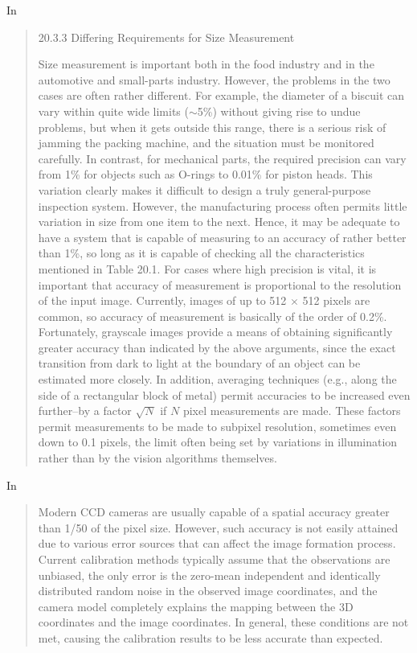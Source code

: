 \documentclass[a4paper,12pt]{article}
\begin{document}
In \cite{Davies:2012:CMV:2341317}
\begin{quotation}
20.3.3 Differing Requirements for Size Measurement

Size measurement is important both in the food industry and in the automotive
and small-parts industry. However, the problems in the two cases are often rather
different. For example, the diameter of a biscuit can vary within quite wide limits
($\sim$5\%) without giving rise to undue problems, but when it gets outside this range,
there is a serious risk of jamming the packing machine, and the situation must be
monitored carefully. In contrast, for mechanical parts, the required precision can
vary from 1\% for objects such as O-rings to 0.01\% for piston heads. This variation
clearly makes it difficult to design a truly general-purpose inspection system.
However, the manufacturing process often permits little variation in size from one
item to the next. Hence, it may be adequate to have a system that is capable of
measuring to an accuracy of rather better than 1\%, so long as it is capable of
checking all the characteristics mentioned in Table 20.1.
For cases where high precision is vital, it is important that accuracy of measurement
is proportional to the resolution of the input image. Currently, images of
up to 512 $\times$ 512 pixels are common, so accuracy of measurement is basically of
the order of 0.2\%. Fortunately, grayscale images provide a means of obtaining
significantly greater accuracy than indicated by the above arguments, since the
exact transition from dark to light at the boundary of an object can be estimated
more closely. In addition, averaging techniques (e.g., along the side of a rectangular
block of metal) permit accuracies to be increased even further--by a factor $\sqrt{N}$
if
$N$ pixel measurements are made. These factors permit measurements to be made to
subpixel resolution, sometimes even down to 0.1 pixels, the limit often being set by
variations in illumination rather than by the vision algorithms themselves.
\end{quotation}

In \cite{oulu}
\begin{quotation}
Modern CCD cameras are usually capable of a spatial accuracy greater than 1/50 of the pixel size. However, such accuracy is not easily attained due to various error sources that can affect the image formation process. Current calibration methods typically assume that the observations are unbiased, the only error is the zero-mean independent and identically distributed random noise in the observed image coordinates, and the camera model completely explains the mapping between the 3D coordinates and the image coordinates. In general, these conditions are not met, causing the calibration results to be less accurate than expected.
\end{quotation}
\end{document}
